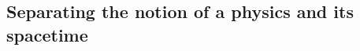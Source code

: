 \documentclass[a4paper,11pt]{article}
\numberwithin{equation}{section}
\theoremstyle{definition}
\newtheorem{comment}{Comment}
\begin{document}

    \subsection{Separating the notion of a physics and its spacetime}
\end{document}
